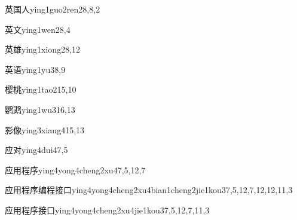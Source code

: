 \begin{entry}{英国人}{ying1guo2ren2}{8,8,2}
\end{entry}

\begin{entry}{英文}{ying1wen2}{8,4}
\end{entry}

\begin{entry}{英雄}{ying1xiong2}{8,12}
\end{entry}

\begin{entry}{英语}{ying1yu3}{8,9}
\end{entry}

\begin{entry}{樱桃}{ying1tao2}{15,10}
\end{entry}

\begin{entry}{鹦鹉}{ying1wu3}{16,13}
\end{entry}

\begin{entry}{影像}{ying3xiang4}{15,13}
\end{entry}

\begin{entry}{应对}{ying4dui4}{7,5}
\end{entry}

\begin{entry}{应用程序}{ying4yong4cheng2xu4}{7,5,12,7}
\end{entry}

\begin{entry}{应用程序编程接口}{ying4yong4cheng2xu4bian1cheng2jie1kou3}{7,5,12,7,12,12,11,3}
\end{entry}

\begin{entry}{应用程序接口}{ying4yong4cheng2xu4jie1kou3}{7,5,12,7,11,3}
\end{entry}

